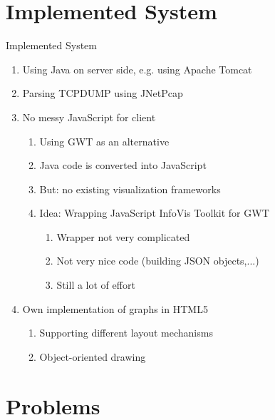 \documentclass{beamer}
\begin{document}
\section{Implemented System}

\begin{frame}{Implemented System}
 \begin{enumerate}
  \item Using Java on server side, e.g. using Apache Tomcat \cite{Tomcat}
  \item Parsing TCPDUMP using JNetPcap
  \item No messy JavaScript for client
  \begin{enumerate}
    \item Using GWT as an alternative
    \item Java code is converted into JavaScript
    \item But: no existing visualization frameworks
    \item Idea: Wrapping JavaScript InfoVis Toolkit for GWT
    \begin{enumerate}
      \item Wrapper not very complicated
      \item Not very nice code (building JSON objects,...)
      \item Still a lot of effort
    \end{enumerate}
  \end{enumerate}
  \item Own implementation of graphs in HTML5
        \begin{enumerate}
	  \item Supporting different layout mechanisms
	  \item Object-oriented drawing
	\end{enumerate}
 \end{enumerate}
\end{frame}


\section{Problems}
\end{document}

